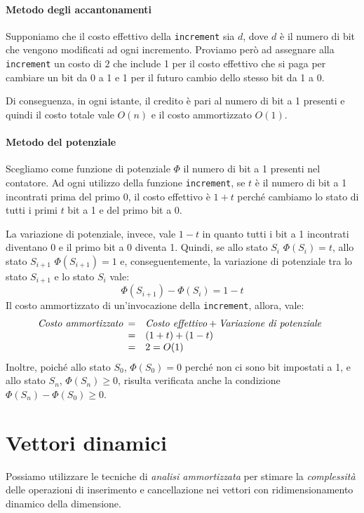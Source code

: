 \begin{eg}
\paragraph{Metodo degli accantonamenti}
Supponiamo che il costo effettivo della \texttt{increment} sia $d$, dove $d$ è
il numero di bit che vengono modificati ad ogni incremento. Proviamo però ad
assegnare alla \texttt{increment} un costo di $2$ che include 1 per il costo
effettivo che si paga per cambiare un bit da 0 a 1 e 1 per il futuro cambio
dello stesso bit da 1 a 0.

Di conseguenza, in ogni istante, il credito è pari al numero di bit a 1
presenti e quindi il costo totale vale $O(n)$ e il costo ammortizzato $O(1)$.

\paragraph{Metodo del potenziale}
Scegliamo come funzione di potenziale $\Phi$ il numero di bit a 1 presenti nel
contatore. Ad ogni utilizzo della funzione \texttt{increment}, se $t$ è il numero
di bit a 1 incontrati prima del primo 0, il costo effettivo è $1+t$ perché
cambiamo lo stato di tutti i primi $t$ bit a 1 e del primo bit a 0.

La variazione di potenziale, invece, vale $1-t$ in quanto tutti i bit a 1
incontrati diventano 0 e il primo bit a 0 diventa 1. Quindi, se allo stato $S_i$
$\Phi(S_i)=t$, allo stato $S_{i+1}$ $\Phi(S_{i+1})=1$ e, conseguentemente, la
variazione di potenziale tra lo stato $S_{i+1}$ e lo stato $S_i$ vale:
\[\Phi(S_{i+1})-\Phi(S_i)=1-t\]
Il costo ammortizzato di un'invocazione della \texttt{increment}, allora, vale:
\[\emph{Costo ammortizzato}\begin{array}[t]{cl}
    = & \emph{Costo effettivo}+\emph{Variazione di potenziale}\\
    = & (1+t)+(1-t)\\
    = & 2 = O(1)
\end{array}\]
Inoltre, poiché allo stato $S_0$, $\Phi(S_0)=0$ perché non ci sono bit impostati a
1, e allo stato $S_n$, $\Phi(S_n)\geq0$, risulta verificata anche la
condizione $\Phi(S_n)-\Phi(S_0)\geq0$.
\end{eg}

\section{Vettori dinamici}
Possiamo utilizzare le tecniche di \emph{analisi ammortizzata} per stimare la
\emph{complessità} delle operazioni di inserimento e cancellazione nei vettori
con ridimensionamento dinamico della dimensione.

